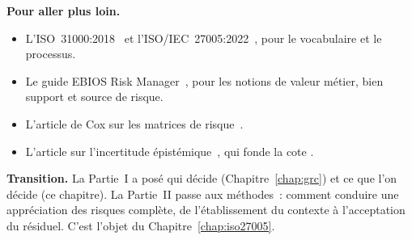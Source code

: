 \begin{boxinfo}
\textbf{Pour aller plus loin.}
\begin{itemize}
    \item L'ISO~31000:2018~\cite{iso31000_2018} et l'ISO/IEC~27005:2022~\cite{iso27005_2022},
          pour le vocabulaire et le processus.
    \item Le guide EBIOS Risk Manager~\cite{anssi2018ebios}, pour les notions
          de valeur métier, bien support et source de risque.
    \item L'article de Cox sur les matrices de risque~\cite{cox2008matrices}.
    \item L'article sur l'incertitude épistémique~\cite{minka2026nek}, qui
          fonde la cote \NEK{}.
\end{itemize}
\end{boxinfo}

\begin{boxinfo}
\textbf{Transition.} La Partie~I a posé qui décide (Chapitre~\ref{chap:grc})
et ce que l'on décide (ce chapitre). La Partie~II passe aux méthodes~:
comment conduire une appréciation des risques complète, de l'établissement
du contexte à l'acceptation du résiduel. C'est l'objet du
Chapitre~\ref{chap:iso27005}.
\end{boxinfo}

